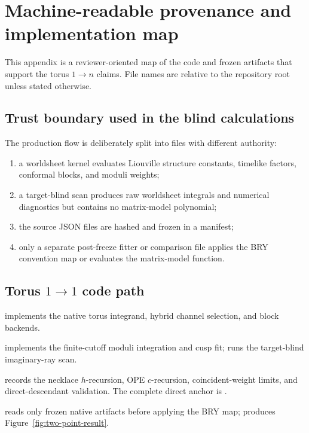\documentclass[11pt]{article}
\begin{document}
\appendix
\section{Machine-readable provenance and implementation map}
\label{sec:code-map}

This appendix is a reviewer-oriented map of the code and frozen artifacts
that support the torus $1\to n$ claims.  File names are relative to the
repository root unless stated otherwise.

\subsection{Trust boundary used in the blind calculations}

The production flow is deliberately split into files with different
authority:
\begin{enumerate}
  \item a worldsheet kernel evaluates Liouville structure constants,
  timelike factors, conformal blocks, and moduli weights;
  \item a target-blind scan produces raw worldsheet integrals and numerical
  diagnostics but contains no matrix-model polynomial;
  \item the source JSON files are hashed and frozen in a manifest;
  \item only a separate post-freeze fitter or comparison file applies the BRY
  convention map or evaluates the matrix-model function.
\end{enumerate}

\subsection{Torus \texorpdfstring{$1\to1$}{1 to 1} code path}

\begin{description}[style=nextline,leftmargin=3.8cm]
  \item[Worldsheet kernel]
   implements the native torus
  integrand, hybrid channel selection, and block backends.

  \item[RQMC production]
   implements the
  finite-cutoff moduli integration and cusp fit;
   runs the target-blind
  imaginary-ray scan.

  \item[Block audit]
   records the
  necklace $h$-recursion, OPE $c$-recursion, coincident-weight limits, and
  direct-descendant validation.  The complete direct anchor is
  .

  \item[Later fit and plot]
   reads only frozen native
  artifacts before applying the BRY map;
   produces
  Figure~\ref{fig:two-point-result}.
\end{description}
\end{document}
